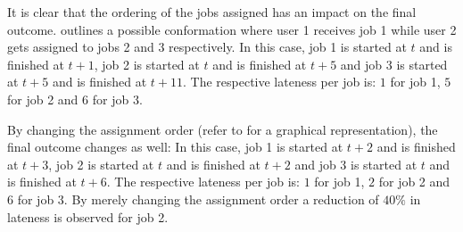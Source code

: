 \documentclass{seal_thesis}
\begin{document}
It is clear that the ordering of the jobs assigned has an impact on the final outcome.  outlines a possible conformation where user 1 receives job 1 while user 2 gets assigned to jobs 2 and 3 respectively. In this case, job 1 is started at $t$ and is finished at $t+1$, job 2 is started at $t$ and is finished at $t+5$ and job 3 is started at $t+5$ and is finished at $t+11$. The respective lateness per job is: $1$ for job 1, $5$ for job 2 and $6$ for job $3$.

By changing the assignment order (refer to  for a graphical representation), the final outcome changes as well: In this case, job 1 is started at $t+2$ and is finished at $t+3$, job 2 is started at $t$ and is finished at $t+2$ and job 3 is started at $t$ and is finished at $t+6$. The respective lateness per job is: $1$ for job 1, $2$ for job 2 and $6$ for job $3$. By merely changing the assignment order a reduction of $40\%$ in lateness is observed for job 2.
\end{document}
